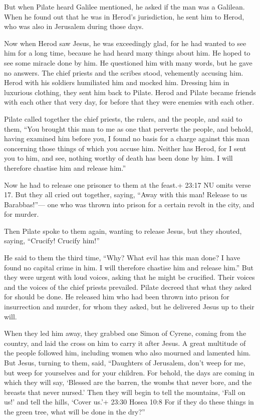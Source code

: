  But when Pilate heard Galilee mentioned, he asked if the
man was a Galilean.  When he found out that he was in
Herod's jurisdiction, he sent him to Herod, who was also in Jerusalem
during those days.

 Now when Herod saw Jesus, he was exceedingly glad, for he
had wanted to see him for a long time, because he had heard many things
about him. He hoped to see some miracle done by him.  He
questioned him with many words, but he gave no answers. 
The chief priests and the scribes stood, vehemently accusing him.
 Herod with his soldiers humiliated him and mocked him.
Dressing him in luxurious clothing, they sent him back to Pilate.
 Herod and Pilate became friends with each other that very
day, for before that they were enemies with each other.

 Pilate called together the chief priests, the rulers, and
the people,  and said to them, ``You brought this man to me
as one that perverts the people, and behold, having examined him before
you, I found no basis for a charge against this man concerning those
things of which you accuse him.  Neither has Herod, for I
sent you to him, and see, nothing worthy of death has been done by him.
 I will therefore chastise him and release him.''

 Now he had to release one prisoner to them at the feast.+
23:17 NU omits verse 17.  But they all cried out together,
saying, ``Away with this man! Release to us Barabbas!''--- 
one who was thrown into prison for a certain revolt in the city, and for
murder.

 Then Pilate spoke to them again, wanting to release Jesus,
 but they shouted, saying, ``Crucify! Crucify him!''

 He said to them the third time, ``Why? What evil has this
man done? I have found no capital crime in him. I will therefore
chastise him and release him.''  But they were urgent with
loud voices, asking that he might be crucified. Their voices and the
voices of the chief priests prevailed.  Pilate decreed that
what they asked for should be done.  He released him who
had been thrown into prison for insurrection and murder, for whom they
asked, but he delivered Jesus up to their will.

 When they led him away, they grabbed one Simon of Cyrene,
coming from the country, and laid the cross on him to carry it after
Jesus.  A great multitude of the people followed him,
including women who also mourned and lamented him.  But
Jesus, turning to them, said, ``Daughters of Jerusalem, don't weep for
me, but weep for yourselves and for your children.  For
behold, the days are coming in which they will say, `Blessed are the
barren, the wombs that never bore, and the breasts that never nursed.'
 Then they will begin to tell the mountains, `Fall on us!'
and tell the hills, `Cover us.'+ 23:30 Hosea 10:8  For if
they do these things in the green tree, what will be done in the dry?''

